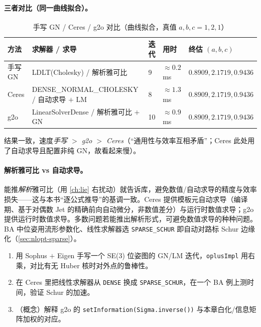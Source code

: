 \paragraph{三者对比（同一曲线拟合）。}\cite{gaoxiang2019slam14}

\begin{table}[H]\centering\small
\caption{手写 GN / Ceres / g2o 对比（曲线拟合，真值 $a,b,c=1,2,1$）}
\label{tab:nlopt-three}
\begin{tabular}{lllll}
\toprule
方法 & 求解器 / 求导 & 迭代 & 用时 & 终估 $(a,b,c)$ \\
\midrule
手写 GN & LDLT(Cholesky) / 解析雅可比 & 9 & $\approx0.2$ ms & $0.8909,2.1719,0.9436$ \\
Ceres & DENSE\_NORMAL\_CHOLESKY / 自动求导 $+$ LM & 8 & $\approx1.3$ ms & $0.8909,2.1719,0.9436$ \\
g2o & LinearSolverDense / 解析雅可比 $+$ GN & 10 & $\approx0.9$ ms & $0.8909,2.1719,0.9436$ \\
\bottomrule
\end{tabular}
\end{table}

\noindent 结果一致，速度\emph{手写 $>$ g2o $>$ Ceres}（“通用性与效率互相矛盾”；Ceres 此处用了自动求导且配置非纯 GN，故看起来慢）。

\paragraph{解析雅可比 vs 自动求导。}\cite{gaoxiang2019slam14}
能推\emph{解析}雅可比（用 \cref{ch:lie} 右扰动）就告诉库，避免数值/自动求导的精度与效率损失——这与本书“逐公式推导”的基调一致。Ceres 提供模板元自动求导（编译期、基于对偶数 Jet 的精确前向自动微分，非数值差分）与运行时数值求导；g2o 提供运行时数值求导。多数问题若能推出解析形式，可避免数值求导的种种问题。BA 中位姿用流形参数化、线性求解器选 \texttt{SPARSE\_SCHUR} 即自动对路标 Schur 边缘化（\cref{sec:nlopt-sparse}）。

\begin{practice}
\begin{enumerate}
  \item 用 Sophus $+$ Eigen 手写一个 SE(3) 位姿图的 GN/LM 迭代，\texttt{oplusImpl} 用右乘，对比有无 Huber 核时对外点的鲁棒性。
  \item 在 Ceres 里把线性求解器从 \texttt{DENSE} 换成 \texttt{SPARSE\_SCHUR}，在一个 BA 例上测时间，验证 Schur 的加速。
  \item （概念）解释 g2o 的 \texttt{setInformation(Sigma.inverse())} 与本章白化/信息矩阵加权的对应。
\end{enumerate}
\end{practice}

